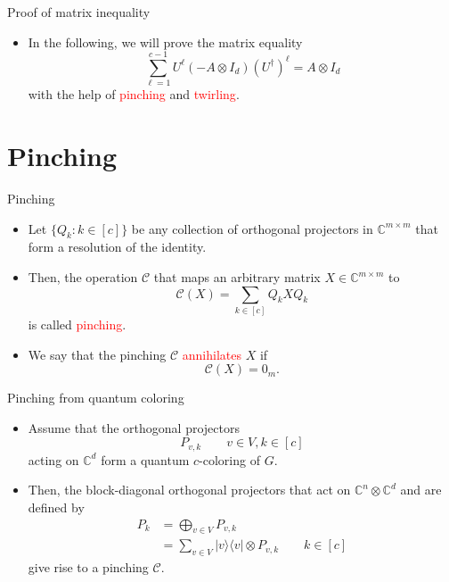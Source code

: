 \documentclass{beamer}
\newcommand{\C}{\mathbb{C}}
\newcommand{\cC}{\mathcal{C}}
\renewcommand{\>}{\rangle}
\newcommand{\<}{\langle}
\begin{document}
%
%
%

\begin{frame}{Proof of matrix inequality}
\begin{itemize}
\item In the following, we will prove the matrix equality
\[
\sum_{\ell=1}^{c-1} U^\ell (-A\otimes I_d) (U^\dagger)^\ell = A \otimes I_d
\]
with the help of \textcolor{red}{pinching} and \textcolor{red}{twirling}.
\end{itemize}
\end{frame}

%

\section{Pinching}

\begin{frame}{Pinching}
\begin{itemize}
\item Let $\{Q_k : k\in [c]\}$ be any collection of orthogonal projectors in $\C^{m\times m}$ that form a resolution of the identity.

\item Then, the operation $\cC$ that maps an arbitrary matrix $X\in\C^{m\times m}$ to
\[
\cC(X) = \sum_{k\in [c]} Q_k X Q_k
\]
is called \textcolor{red}{pinching}.

\item We say that the pinching $\cC$ \textcolor{red}{annihilates} $X$ if
\[
\cC(X) = 0_m.
\]
\end{itemize}
\end{frame}

%

\begin{frame}{Pinching from quantum coloring}

\begin{itemize}
\item Assume that the orthogonal projectors 
\[
P_{v,k} \quad \quad v \in V, k \in [c] 
\]
acting on $\C^d$ form a quantum $c$-coloring of $G$.

\medskip
\item Then, the block-diagonal orthogonal projectors that act on $\C^n\otimes \C^d$ and are defined by
\begin{align*}
P_k 
&= 
\bigoplus_{v\in V} P_{v,k} \\
&= 
\sum_{v\in V} |v\>\<v| \otimes P_{v,k} \quad \quad k \in [c]
\end{align*}
give rise to a pinching $\cC$.
\end{itemize}

\end{frame}
\end{document}
